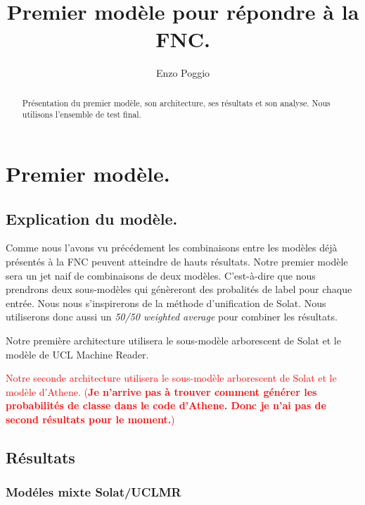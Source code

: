 \documentclass[onecolumn, 12pt]{article}
\title{Premier modèle pour répondre à la FNC.}
\author{Enzo Poggio}
\begin{document}
\maketitle{}


\begin{abstract}
 Présentation du premier modèle, son architecture, ses résultats et son analyse.
 Nous utilisons l'ensemble de test final.
\end{abstract}

\section{Premier modèle.}
\subsection{Explication du modèle.}
Comme nous l'avons vu précédement les combinaisons entre les modèles déjà présentés à la FNC peuvent atteindre de hauts résultats.
Notre premier modèle sera un jet naif de combinaisons de deux modèles.
C'est-à-dire que nous prendrons deux sous-modèles qui génèreront des probalités de label pour chaque entrée.
Nous nous s'inspirerons de la méthode d'unification de Solat.
Nous utiliserons donc aussi un \textit{ 50/50 weighted average} pour combiner les résultats.

Notre première architecture utilisera le sous-modèle arborescent de Solat et le modèle de UCL Machine Reader.

\textcolor{red}{Notre seconde architecture utilisera le sous-modèle arborescent de Solat et le modèle d'Athene. (\textbf{Je n'arrive pas à trouver comment générer les probabilités de classe dans le code d'Athene. Donc je n'ai pas de second résultats pour le moment.})}
\subsection{Résultats}

\subsubsection{Modéles mixte Solat/UCLMR}
\end{document}
